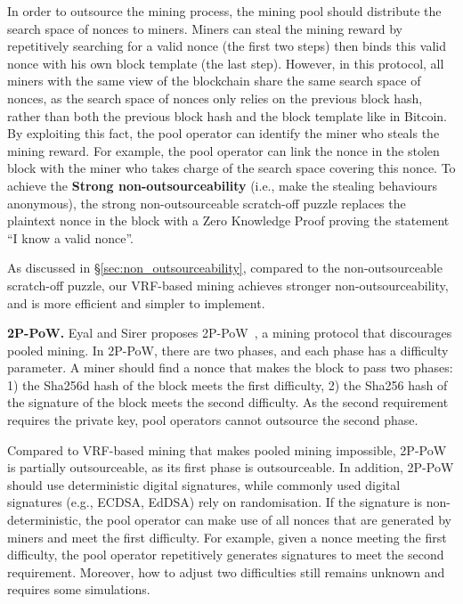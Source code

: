 In order to outsource the mining process, the mining pool should distribute the search space of nonces to miners.
Miners can steal the mining reward by repetitively searching for a valid nonce (the first two steps) then binds this valid nonce with his own block template (the last step).
However, in this protocol, all miners with the same view of the blockchain share the same search space of nonces, as the search space of nonces only relies on the previous block hash, rather than both the previous block hash and the block template like in Bitcoin.
By exploiting this fact, the pool operator can identify the miner who steals the mining reward.
For example, the pool operator can link the nonce in the stolen block with the miner who takes charge of the search space covering this nonce.
To achieve the \textbf{Strong non-outsourceability} (i.e., make the stealing behaviours anonymous), the strong non-outsourceable scratch-off puzzle replaces the plaintext nonce in the block with a Zero Knowledge Proof proving the statement ``I know a valid nonce''.

As discussed in \S\ref{sec:non_outsourceability}, compared to the non-outsourceable scratch-off puzzle, our VRF-based mining achieves stronger non-outsourceability, and is more efficient and simpler to implement.

\textbf{2P-PoW.}
Eyal and Sirer proposes 2P-PoW~\cite{2P-PoW}, a mining protocol that discourages pooled mining.
In 2P-PoW, there are two phases, and each phase has a difficulty parameter.
A miner should find a nonce that makes the block to pass two phases: 1) the Sha256d hash of the block meets the first difficulty, 2) the Sha256 hash of the signature of the block meets the second difficulty.
As the second requirement requires the private key, pool operators cannot outsource the second phase.

Compared to VRF-based mining that makes pooled mining impossible, 2P-PoW is partially outsourceable, as its first phase is outsourceable.
In addition, 2P-PoW should use deterministic digital signatures, while commonly used digital signatures (e.g., ECDSA, EdDSA) rely on randomisation.
If the signature is non-deterministic, the pool operator can make use of all nonces that are generated by miners and meet the first difficulty.
For example, given a nonce meeting the first difficulty, the pool operator repetitively generates signatures to meet the second requirement.
Moreover, how to adjust two difficulties still remains unknown and requires some simulations.




